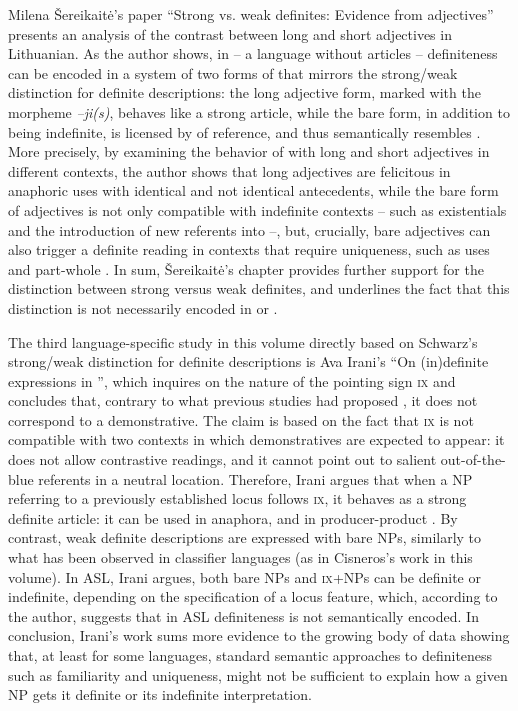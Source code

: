 \documentclass[output=paper]{langsci/langscibook}
\begin{document}
Milena Šereikaitė’s paper “Strong vs. weak definites: Evidence from  adjectives” presents an analysis of the contrast between long and short adjectives in Lithuanian. As the author shows, in  -- a language without articles -- definiteness can be encoded in a system of two forms of  that mirrors the strong/weak distinction for definite descriptions: the long adjective form, marked with the morpheme \textit{–ji(s)}, behaves like a strong article, while the bare form, in addition to being indefinite, is licensed by  of reference, and thus semantically resembles . More precisely, by examining the behavior of  with long and short adjectives in different contexts, the author shows that long adjectives are felicitous in anaphoric uses with identical and not identical antecedents, while the bare form of adjectives is not only compatible with indefinite contexts -- such as existentials and the introduction of new referents into  --, but, crucially, bare adjectives can also trigger a definite reading in contexts that require uniqueness, such as  uses and part-whole . In sum, Šereikaitė’s chapter provides further support for the distinction between strong versus weak definites, and underlines the fact that this distinction is not necessarily encoded in  or . 

The third language-specific study in this volume directly based on Schwarz’s strong/weak distinction for definite descriptions is Ava Irani’s “On (in)definite expressions in ”, which inquires on the nature of the pointing sign \textsc{ix} and concludes that, contrary to what previous studies had proposed \citep{KoulidobrovaLilloMartin2016}, it does not correspond to a demonstrative. The claim is based on the fact that \textsc{ix} is not compatible with two contexts in which demonstratives are expected to appear: it does not allow contrastive readings, and it cannot point out to salient out-of-the-blue referents in a neutral location. Therefore, Irani argues that when a NP referring to a previously established locus follows \textsc{ix}, it behaves as a strong definite article: it can be used in anaphora, and in producer-product . By contrast, weak definite descriptions are expressed with bare NPs, similarly to what has been observed in classifier languages (as in Cisneros’s work in this volume). In ASL, Irani argues, both bare NPs and \textsc{ix}+NPs can be definite or indefinite, depending on the specification of a locus feature, which, according to the author, suggests that in ASL definiteness is not semantically encoded. In conclusion, Irani’s work sums more evidence to the growing body of data showing that, at least for some languages, standard semantic approaches to definiteness such as familiarity and uniqueness, might not be sufficient to explain how a given NP gets it definite or its indefinite interpretation. 
\end{document}
